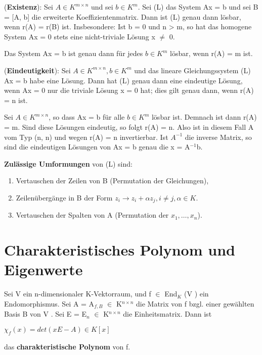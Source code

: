 \begin{proposition}
(\textbf{Existenz}): Sei $A \in K^{m \times n}$ und sei $b \in K^m$. Sei (L) das System Ax = b und sei B = [A, b] die erweiterte Koeffizientenmatrix. Dann ist (L) genau dann lösbar, wenn r(A) = r(B) ist. Insbesondere: Ist b = 0 und n > m, so hat das homogene System Ax = 0 stets eine nicht-triviale Lösung x $\neq$ 0.
\end{proposition}

\begin{remark}
Das System Ax = b ist genau dann für jedes $b \in K^m$ lösbar, wenn r(A) = m ist.
\end{remark}

\begin{proposition}
(\textbf{Eindeutigkeit}): Sei $A \in K^{m \times n},b \in K^m$ und das lineare Gleichungssystem (L) Ax = b habe eine Lösung. Dann hat (L) genau dann eine eindeutige Lösung, wenn Ax = 0 nur die triviale Lösung x = 0 hat; dies gilt genau dann, wenn r(A) = n ist.
\end{proposition}

\begin{remark}
Sei $A \in K^{m \times n}$, so dass Ax = b für alle $b \in K^m$ lösbar ist. Demnach ist dann r(A) = m. Sind diese Lösungen eindeutig, so folgt r(A) = n. Also ist in diesem Fall A vom Typ (n, n) und wegen r(A) = n invertierbar. Ist $A^{-1}$ die inverse Matrix, so sind die eindeutigen Lösungen von Ax = b genau die x = A$^{-1}$b.
\end{remark}

\textbf{Zulässige Umformungen} von (L) sind:
\begin{enumerate}
\item Vertauschen der Zeilen von B (Permutation der Gleichungen),
\item Zeilenübergänge in B der Form $z_i \to z_i+\alpha z_j, i \neq j,\alpha \in K$.
\item Vertauschen der Spalten von A (Permutation der $x_1, …, x_n$).
\end{enumerate}


\section{Charakteristisches Polynom und Eigenwerte}
\begin{definition}
Sei V ein n-dimensionaler K-Vektorraum, und f $\in$ End$_K$ (V ) ein Endomorphismus. Sei A = A$_{f,B}$ $\in$ K$^{n \times n}$ die Matrix von f bzgl. einer gewählten Basis B von V . Sei E = E$_n$ $\in$ K$^{n \times n}$ die Einheitsmatrix. Dann ist
\begin{center}
$\chi_f (x) = det(xE - A) \in K[x]$
\end{center}
das \textbf{charakteristische Polynom} von f.
\end{definition}

